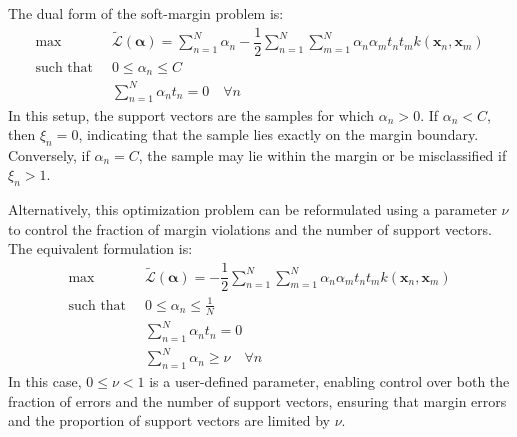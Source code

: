 The dual form of the soft-margin problem is:
\begin{align*}
    \max                      \:&\: \tilde{\mathcal{L}}(\boldsymbol{\alpha})=\sum_{n=1}^{N}\alpha_n-\dfrac{1}{2}\sum_{n=1}^{N}\sum_{m=1}^N{\alpha_n \alpha_m t_n t_m k(\mathbf{x}_n, \mathbf{x}_m)}         \\
    \text{such that }           &\: 0 \leq \alpha_n \leq C \\
                                &\: \sum_{n=1}^{N}\alpha_n t_n = 0 \quad \forall n
\end{align*}  
In this setup, the support vectors are the samples for which $\alpha_n > 0$.
If $\alpha_n < C$, then $\xi_n = 0$, indicating that the sample lies exactly on the margin boundary.
Conversely, if $\alpha_n = C$, the sample may lie within the margin or be misclassified if $\xi_n > 1$.

Alternatively, this optimization problem can be reformulated using a parameter $\nu$ to control the fraction of margin violations and the number of support vectors.
The equivalent formulation is:
\begin{align*}
    \max                      \:&\: \tilde{\mathcal{L}}(\boldsymbol{\alpha})=-\dfrac{1}{2}\sum_{n=1}^{N}\sum_{m=1}^N{\alpha_n \alpha_m t_n t_m k(\mathbf{x}_n, \mathbf{x}_m)}         \\
    \text{such that }           &\: 0 \leq \alpha_n \leq \frac{1}{N} \\
                                &\: \sum_{n=1}^{N}\alpha_n t_n = 0 \\
                                &\: \sum_{n=1}^{N}\alpha_n\geq \nu \quad \forall n
\end{align*}  
In this case, $0\leq\nu<1$ is a user-defined parameter, enabling control over both the fraction of errors and the number of support vectors, ensuring that margin errors and the proportion of support vectors are limited by $\nu$. 

